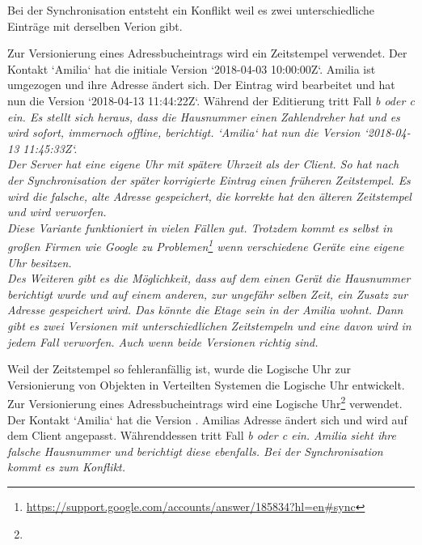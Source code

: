 \begin{description}[leftmargin=0.5cm,style=nextline]
    Bei der Synchronisation entsteht ein Konflikt weil es zwei unterschiedliche Einträge mit derselben Verion gibt.\\
  \item[Methode V1  -- Zeitstempel:]
    Zur Versionierung eines Adressbucheintrags wird ein Zeitstempel verwendet. Der Kontakt `Amilia` hat die initiale Version `2018-04-03 10:00:00Z`.
    Amilia ist umgezogen und ihre Adresse ändert sich. Der Eintrag wird bearbeitet und hat nun die Version `2018-04-13 11:44:22Z`.
    Während der Editierung tritt Fall \it{b} oder \it{c} ein.
    Es stellt sich heraus, dass die Hausnummer einen Zahlendreher hat und es wird sofort, immernoch offline, berichtigt. `Amilia` hat nun die Version `2018-04-13 11:45:33Z`.\\
    Der Server hat eine eigene Uhr mit spätere Uhrzeit als der Client.
    So hat nach der Synchronisation der später korrigierte Eintrag einen früheren Zeitstempel.
    Es wird die falsche, alte Adresse gespeichert, die korrekte hat den älteren Zeitstempel und wird verworfen.\\
    Diese Variante funktioniert in vielen Fällen gut. Trotzdem kommt es selbst in großen Firmen wie Google zu Problemen\footnote{\url{https://support.google.com/accounts/answer/185834?hl=en\#sync}} wenn verschiedene Geräte eine eigene Uhr besitzen.\\
    Des Weiteren gibt es die Möglichkeit, dass auf dem einen Gerät die Hausnummer berichtigt wurde und auf einem anderen, zur ungefähr selben Zeit, ein Zusatz zur Adresse gespeichert wird. Das könnte die Etage sein in der Amilia wohnt. Dann gibt es zwei Versionen mit unterschiedlichen Zeitstempeln und eine davon wird in jedem Fall verworfen. Auch wenn beide Versionen richtig sind.\\
  \item[Methode V2 -- Logische Uhr:]
    Weil der Zeitstempel so fehleranfällig ist, wurde die Logische Uhr zur Versionierung von Objekten in Verteilten Systemen die Logische Uhr entwickelt.\\
    Zur Versionierung eines Adressbucheintrags wird eine Logische Uhr\footnote{\logicalclock} verwendet. Der Kontakt `Amilia` hat die Version .
    Amilias Adresse ändert sich und wird auf dem Client angepasst.
    Währenddessen tritt Fall \it{b} oder \it{c} ein.
    Amilia sieht ihre falsche Hausnummer und berichtigt diese ebenfalls.
    Bei der Synchronisation kommt es zum Konflikt. \\

\end{description}

